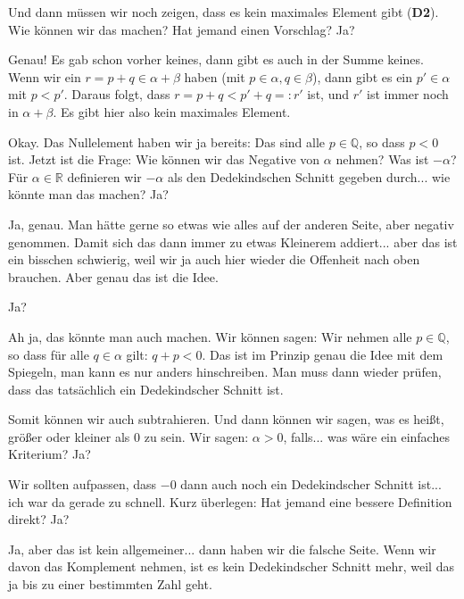 \begin{spoken-clean}[00:40:51 - 00:43:03]
Und dann müssen wir noch zeigen, dass es kein maximales Element gibt (\textbf{D2}). Wie können wir das machen? Hat jemand einen Vorschlag? Ja?


Genau! Es gab schon vorher keines, dann gibt es auch in der Summe keines. Wenn wir ein $r = p + q \in \alpha + \beta$ haben (mit $p \in \alpha, q \in \beta$), dann gibt es ein $p' \in \alpha$ mit $p < p'$. Daraus folgt, dass $r = p + q < p' + q =: r'$ ist, und $r'$ ist immer noch in $\alpha + \beta$. Es gibt hier also kein maximales Element.

Okay. Das Nullelement haben wir ja bereits: Das sind alle $p \in \mathbb{Q}$, so dass $p < 0$ ist. Jetzt ist die Frage: Wie können wir das Negative von $\alpha$ nehmen? Was ist $-\alpha$? Für $\alpha \in \mathbb{R}$ definieren wir $-\alpha$ als den Dedekindschen Schnitt gegeben durch... wie könnte man das machen? Ja?


Ja, genau. Man hätte gerne so etwas wie alles auf der anderen Seite, aber negativ genommen. Damit sich das dann immer zu etwas Kleinerem addiert... aber das ist ein bisschen schwierig, weil wir ja auch hier wieder die Offenheit nach oben brauchen. Aber genau das ist die Idee.
\end{spoken-clean}

\begin{spoken-clean}[00:43:03 - 00:44:52]
Ja?


Ah ja, das könnte man auch machen. Wir können sagen: Wir nehmen alle $p \in \mathbb{Q}$, so dass für alle $q \in \alpha$ gilt: $q + p < 0$. Das ist im Prinzip genau die Idee mit dem Spiegeln, man kann es nur anders hinschreiben. Man muss dann wieder prüfen, dass das tatsächlich ein Dedekindscher Schnitt ist.

Somit können wir auch subtrahieren. Und dann können wir sagen, was es heißt, größer oder kleiner als $0$ zu sein. Wir sagen: $\alpha > 0$, falls... was wäre ein einfaches Kriterium? Ja?


Wir sollten aufpassen, dass $-0$ dann auch noch ein Dedekindscher Schnitt ist... ich war da gerade zu schnell. Kurz überlegen: Hat jemand eine bessere Definition direkt? Ja?


Ja, aber das ist kein allgemeiner... dann haben wir die falsche Seite. Wenn wir davon das Komplement nehmen, ist es kein Dedekindscher Schnitt mehr, weil das ja bis zu einer bestimmten Zahl geht.
\end{spoken-clean}

